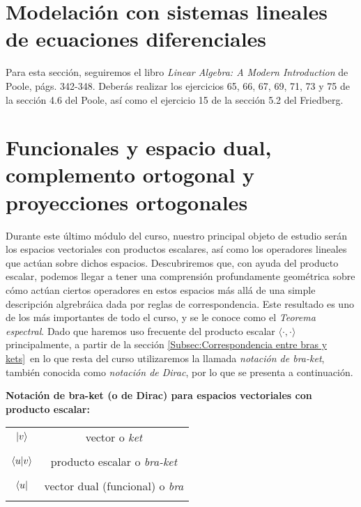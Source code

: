 \documentclass[12pt,dvipsnames]{article}
\begin{document}
\newpage
\section{Modelación con sistemas lineales de ecuaciones diferenciales} \label{Sec:Modelación con sistemas lineales de ecuaciones diferenciales} 
Para esta sección, seguiremos el libro \emph{Linear Algebra: A Modern Introduction} de Poole, págs. 342-348. Deberás realizar los ejercicios 65, 66, 67, 69, 71, 73 y 75 de la sección 4.6 del Poole, así como el ejercicio 15 de la sección 5.2 del Friedberg.

\newpage

\section{Funcionales y espacio dual, complemento ortogonal y proyecciones ortogonales} \label{Sec:13} 

Durante este último módulo del curso, nuestro principal objeto de estudio serán los espacios vectoriales con productos escalares, así como los operadores lineales que actúan sobre dichos espacios. Descubriremos que, con ayuda del producto escalar, podemos llegar a tener una comprensión profundamente geométrica sobre cómo actúan ciertos operadores en estos espacios \textemdash más allá de una simple descripción algrebráica dada por reglas de correspondencia. Este resultado es uno de los más importantes de todo el curso, y se le conoce como el \emph{Teorema espectral}. Dado que haremos uso frecuente del producto escalar  $\langle\cdot ,\cdot\rangle$ \textemdash principalmente, a partir de la sección \ref{Subsec:Correspondencia entre bras y kets}\textemdash \ en lo que resta del curso utilizaremos la llamada \emph{notación de bra-ket}, también conocida como \emph{notación de Dirac}, por lo que se presenta a continuación.

\vspace{3mm}

\textbf{Notación de bra-ket (o de Dirac) para espacios vectoriales con producto escalar:}
\begin{tcolorbox}
    \centering
    \begin{tabular}{cc}
        \\
        $\ket{v}$ & vector o \emph{ket}  \\ \\
        $\braket{u|v}$ & producto escalar o \emph{bra-ket}  \\ \\
        $\bra{u}$ & vector dual (funcional) o \emph{bra} \\ \\
    \end{tabular}
\end{tcolorbox}
\end{document}
